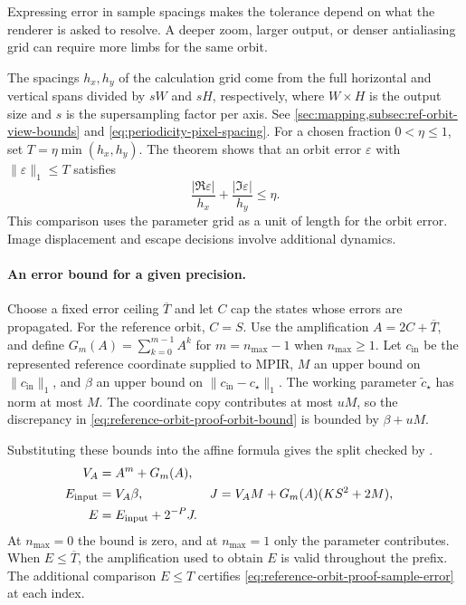 Expressing error in sample spacings makes the tolerance depend on what
the renderer is asked to resolve. A deeper zoom, larger output, or denser
antialiasing grid can require more limbs for the same orbit.

The spacings \(h_x,h_y\) of the calculation grid come from the full
horizontal and vertical spans divided by \(sW\) and \(sH\), respectively,
where \(W\times H\) is the output size and \(s\) is the supersampling factor
per axis. See \cref{sec:mapping,subsec:ref-orbit-view-bounds} and
\eqref{eq:periodicity-pixel-spacing}. For a chosen fraction \(0<\eta\le1\),
set \(T=\eta\min(h_x,h_y)\). The theorem 
shows that an orbit error \(\varepsilon\) with \(\lVert\varepsilon\rVert_1\le T\)
satisfies
\begin{equation}
  \frac{|\Re\varepsilon|}{h_x}+\frac{|\Im\varepsilon|}{h_y}\le\eta .
  \label{eq:reference-orbit-proof-sample-error}
\end{equation}
This comparison uses the parameter grid as a unit of length for the orbit
error. Image displacement and escape decisions involve additional dynamics.

\paragraph{An error bound for a given precision.}
Choose a fixed error ceiling \(\overline T\) and let \(C\) cap the states
whose errors are propagated. For the reference orbit, \(C=S\). Use the
amplification \(A=2C+\overline T\), and define \(G_m(A)=\sum_{k=0}^{m-1}A^k\)
for \(m=n_{\max}-1\) when \(n_{\max}\ge1\). Let \(c_{\mathrm{in}}\) be the
represented reference coordinate supplied to MPIR, \(M\) an upper bound
on \(\lVert c_{\mathrm{in}}\rVert_1\), and \(\beta\) an upper bound on
\(\lVert c_{\mathrm{in}}-c_\star\rVert_1\). The working parameter
\(\widetilde c_\star\) has norm at most \(M\). The coordinate copy contributes
at most \(uM\), so the discrepancy in \eqref{eq:reference-orbit-proof-orbit-bound}
is bounded by \(\beta+uM\).

Substituting these bounds into the affine formula gives the split checked
by .
\begin{align}
  V_A &= A^m+G_m(A), \notag\\
  E_{\mathrm{input}} &= V_A\beta,
  & J &= V_A M+G_m(A)(KS^2+2M), \notag\\
  E &= E_{\mathrm{input}}+2^{-P}J.
  \label{eq:reference-orbit-proof-limb-budget}
\end{align}
At \(n_{\max}=0\) the bound is zero, and at \(n_{\max}=1\) only the parameter
contributes. When \(E\le\overline T\), the amplification used to obtain
\(E\) is valid throughout the prefix. The additional comparison \(E\le T\)
certifies \eqref{eq:reference-orbit-proof-sample-error} at each index.

